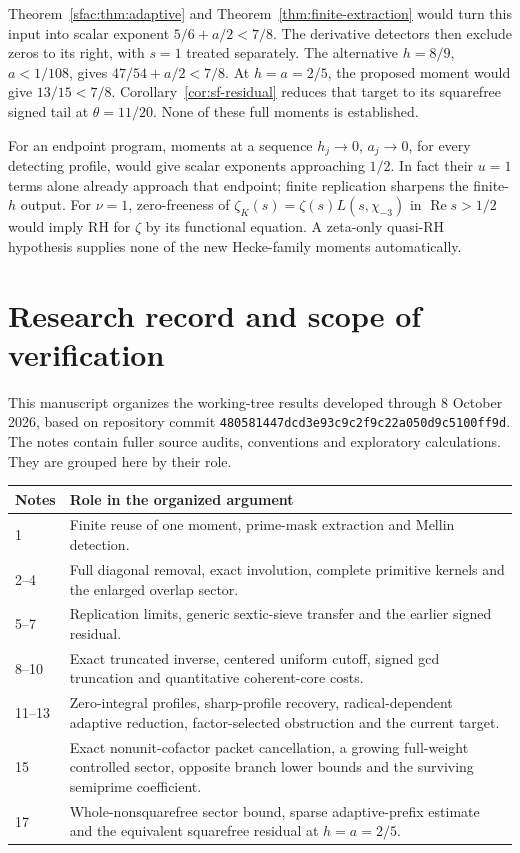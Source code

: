 \documentclass[11pt]{article}
\numberwithin{equation}{section}
\theoremstyle{definition}
\theoremstyle{remark}
\newcommand{\Rea}{\operatorname{Re}}
\begin{document}
Theorem~\ref{sfac:thm:adaptive} and
Theorem~\ref{thm:finite-extraction} would turn this input into
scalar exponent \(5/6+a/2<7/8\).
The derivative detectors then exclude zeros to its right,
with \(s=1\) treated separately.
The alternative \(h=8/9\), \(a<1/108\), gives
\(47/54+a/2<7/8\).
At \(h=a=2/5\), the proposed moment would give \(13/15<7/8\).
Corollary~\ref{cor:sf-residual} reduces that target to its squarefree
signed tail at \(\theta=11/20\). None of these full moments is
established.

For an endpoint program, moments at a sequence
\(h_j\to0\), \(a_j\to0\), for every detecting profile, would give
scalar exponents approaching \(1/2\).
In fact their \(u=1\) terms alone already approach that endpoint;
finite replication sharpens the finite-\(h\) output.
For \(\nu=1\), zero-freeness of
\(\zeta_K(s)=\zeta(s)L(s,\chi_{-3})\) in \(\Rea s>1/2\)
would imply RH for \(\zeta\) by its functional equation.
A zeta-only quasi-RH hypothesis supplies none of the new
Hecke-family moments automatically.

\appendix
\section{Research record and scope of verification}\label{sec:record}

This manuscript organizes the working-tree results developed through
8 October 2026, based on repository commit
\texttt{480581447dcd3e93c9c2f9c22a050d9c5100ff9d}.
The notes contain fuller source audits, conventions and exploratory
calculations. They are grouped here by their role.

\begin{center}\small
\begin{tabular}{@{}p{}p{}@{}}
\toprule
Notes & Role in the organized argument\\
\midrule
1 & Finite reuse of one moment, prime-mask extraction and Mellin detection.\\
2--4 & Full diagonal removal, exact involution, complete primitive kernels
and the enlarged overlap sector.\\
5--7 & Replication limits, generic sextic-sieve transfer and the earlier
signed residual.\\
8--10 & Exact truncated inverse, centered uniform cutoff, signed gcd
truncation and quantitative coherent-core costs.\\
11--13 & Zero-integral profiles, sharp-profile recovery, radical-dependent
adaptive reduction, factor-selected obstruction and the current target.\\
15 & Exact nonunit-cofactor packet cancellation, a growing full-weight
controlled sector, opposite branch lower bounds and the surviving
semiprime coefficient.\\
17 & Whole-nonsquarefree sector bound, sparse adaptive-prefix estimate
and the equivalent squarefree residual at \(h=a=2/5\).\\
\bottomrule
\end{tabular}
\end{center}
\end{document}
